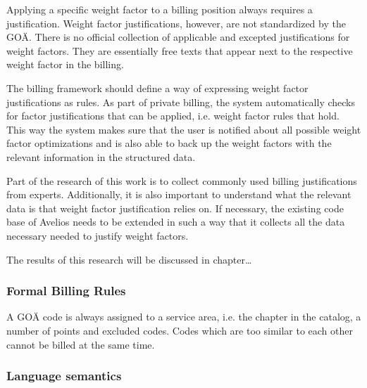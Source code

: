 Applying a specific weight factor to a billing position always requires a justification.
Weight factor justifications, however, are not standardized by the GOÄ\cite[]{bruck1998kommentar}.
There is no official collection of applicable and excepted justifications for weight factors.
They are essentially free texts that appear next to the respective weight factor in the billing.


The billing framework should define a way of expressing weight factor justifications as rules.
As part of private billing, the system automatically checks for factor justifications that can be applied, i.e. weight factor rules that hold.
This way the system makes sure that the user is notified about all possible weight factor optimizations and is also able to back up the weight factors with the relevant information in the structured data.

Part of the research of this work is to collect commonly used billing justifications from experts.
Additionally, it is also important to understand what the relevant data is that weight factor justification relies on.
If necessary, the existing code base of Avelios needs to be extended in such a way that it collects all the data necessary needed to justify weight factors.

The results of this research will be discussed in chapter\ldots

\subsubsection{Formal Billing Rules}



A GOÄ code is always assigned to a service area, i.e. the chapter in the catalog, a number of points and excluded codes.
Codes which are too similar to each other cannot be billed at the same time.

\subsubsection{Language semantics}

